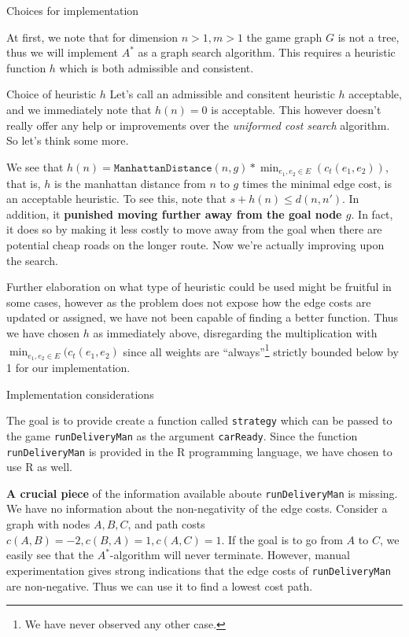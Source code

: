   \begin{subsection}{Choices for implementation}

    At first, we note that for dimension $n > 1, m > 1$ the game graph $G$ is not a tree, thus we will implement $A^*$ as a graph search algorithm. This requires a heuristic function $h$ which is both admissible and consistent.

    \begin{subsubsection}{Choice of heuristic $h$}
      Let's call an admissible and consitent heuristic $h$ acceptable, and we immediately note that $h(n) = 0$ is acceptable. This however doesn't really offer any help or improvements over the \textit{uniformed cost search} algorithm. So let's think some more.

      We see that $h(n) = \texttt{ManhattanDistance}(n, g) * \min_{e_1, e_2\in E}(c_t(e_1, e_2))$, that is, $h$ is the manhattan distance from $n$ to $g$ times the minimal edge cost, is an acceptable heuristic. To see this, note that $s + h(n) \leq d(n, n')$. In addition, it \textbf{punished moving further away from the goal node $g$}. In fact, it does so by making it less costly to move away from the goal when there are potential cheap roads on the longer route. Now we're actually improving upon the search.

      Further elaboration on what type of heuristic could be used might be fruitful in some cases, however as the problem does not expose how the edge costs are updated or assigned, we have not been capable of finding a better function. Thus we have chosen $h$ as immediately above, disregarding the multiplication with $\min_{e_1, e_2\in E}(c_t(e_1, e_2)$ since all weights are ``always''\footnote{We have never observed any other case.} strictly bounded below by 1 for our implementation.
    \end{subsubsection}
    
    \begin{subsubsection}{Implementation considerations}

      The goal is to provide create a function called \texttt{strategy} which can be passed to the game \texttt{runDeliveryMan} as the argument \texttt{carReady}. Since the function \texttt{runDeliveryMan} is provided in the R programming language, we have chosen to use R as well. 

      \textbf{A crucial piece} of the information available aboute \texttt{runDeliveryMan} is missing. We have no information about the non-negativity of the edge costs. Consider a graph with nodes $A, B, C$, and path costs $c(A, B) = -2, c(B, A) = 1, c(A, C) = 1$. If the goal is to go from $A$ to $C$, we easily see that the $A^*$-algorithm will never terminate. However, manual experimentation gives strong indications that the edge costs of \texttt{runDeliveryMan} are non-negative. Thus we can use it to find a lowest cost path. 


\end{subsubsection}
\end{subsection}
